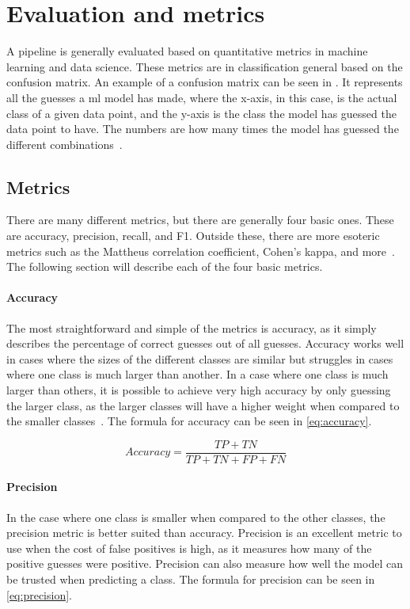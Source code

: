 \section{Evaluation and metrics}\label{sec:evalueation}

A pipeline is generally evaluated based on quantitative metrics in machine learning and data science. These metrics are in classification general based on the confusion matrix. An example of a confusion matrix can be seen in . It represents all the guesses a \gls{ml} model has made, where the x-axis, in this case, is the actual class of a given data point, and the y-axis is the class the model has guessed the data point to have. The numbers are how many times the model has guessed the different combinations~\cite{james-statistical-learning}. 

\subsection{Metrics}
There are many different metrics, but there are generally four basic ones. These are accuracy, precision, recall, and F1. Outside these, there are more esoteric metrics such as the Mattheus correlation coefficient, Cohen's kappa, and more~\cite{metrics-for-multi}. The following section will describe each of the four basic metrics. 

\paragraph{Accuracy} The most straightforward and simple of the metrics is accuracy, as it simply describes the percentage of correct guesses out of all guesses. Accuracy works well in cases where the sizes of the different classes are similar but struggles in cases where one class is much larger than another. In a case where one class is much larger than others, it is possible to achieve very high accuracy by only guessing the larger class, as the larger classes will have a higher weight when compared to the smaller classes~\cite{metrics-for-multi}. The formula for accuracy can be seen in \ref{eq:accuracy}.

\begin{equation}
    Accuracy = \frac{TP + TN}{TP + TN + FP + FN}
\end{equation}\label{eq:accuracy}

\paragraph{Precision} In the case where one class is smaller when compared to the other classes, the precision metric is better suited than accuracy. Precision is an excellent metric to use when the cost of false positives is high, as it measures how many of the positive guesses were positive. Precision can also measure how well the model can be trusted when predicting a class\cite{metrics-for-multi}. The formula for precision can be seen in \ref{eq:precision}.

